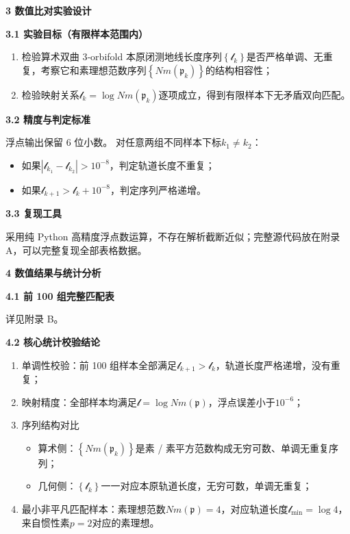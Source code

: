 \documentclass[12pt]{article}
\begin{document}
\textbf{3 数值比对实验设计}

\textbf{3.1 实验目标（有限样本范围内）}

\begin{enumerate}
\def\labelenumi{\arabic{enumi}.}
\item
  检验算术双曲 3‑orbifold
  本原闭测地线长度序列\(\left\{ \mathcal{l}_{k} \right\}\)是否严格单调、无重复，考察它和素理想范数序列\(\left\{ Nm\left( \mathfrak{p}_{k} \right) \right\}\)的结构相容性；
\item
  检验映射关系\(\mathcal{l}_{k} = \log Nm\left( \mathfrak{p}_{k} \right)\)逐项成立，得到有限样本下无矛盾双向匹配。
\end{enumerate}

\textbf{3.2 精度与判定标准}

浮点输出保留 6 位小数。 对任意两组不同样本下标\(k_{1} \neq k_{2}\)：

\begin{itemize}
\item
  如果\(\left| \mathcal{l}_{k_{1}} - \mathcal{l}_{k_{2}} \right| > 10^{- 8}\)，判定轨道长度不重复；
\item
  如果\(\mathcal{l}_{k + 1} > \mathcal{l}_{k} + 10^{- 8}\)，判定序列严格递增。
\end{itemize}

\textbf{3.3 复现工具}

采用纯 Python 高精度浮点数运算，不存在解析截断近似；完整源代码放在附录
A，可以完整复现全部表格数据。

\textbf{4 数值结果与统计分析}

\textbf{4.1 前 100 组完整匹配表}

详见附录 B。

\textbf{4.2 核心统计校验结论}

\begin{enumerate}
\def\labelenumi{\arabic{enumi}.}
\item
  单调性校验：前 100
  组样本全部满足\(\mathcal{l}_{k + 1} > \mathcal{l}_{k}\)，轨道长度严格递增，没有重复；
\item
  映射精度：全部样本均满足\(\mathcal{l =}\log Nm\left( \mathfrak{p} \right)\)，浮点误差小于\(10^{- 6}\)；
\item
  序列结构对比

  \begin{itemize}
  \item
    算术侧：\(\left\{ Nm\left( \mathfrak{p}_{k} \right) \right\}\)是素 /
    素平方范数构成无穷可数、单调无重复序列；
  \item
    几何侧：\(\left\{ \mathcal{l}_{k} \right\}\)一一对应本原轨道长度，无穷可数，单调无重复；
  \end{itemize}
\item
  最小非平凡匹配样本：素理想范数\(Nm\left( \mathfrak{p} \right) = 4\)，对应轨道长度\(\mathcal{l}_{\min} = \log 4\)，来自惯性素\(p = 2\)对应的素理想。
\end{enumerate}
\end{document}
